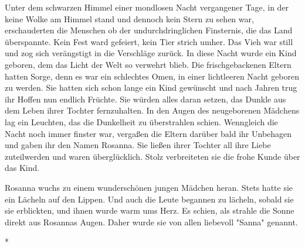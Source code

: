 \documentclass[10pt, a4paper, oneside]{book}
\begin{document}
\begin{multicols}{2}
Unter dem schwarzen Himmel einer mondlosen Nacht vergangener Tage, in der keine Wolke am Himmel stand und dennoch kein Stern zu sehen war, erschauderten die Menschen ob der undurchdringlichen Finsternis, die das Land überspannte. Kein Fest ward gefeiert, kein Tier strich umher. Das Vieh war still und zog sich verängstigt in die Verschläge zurück. In diese Nacht wurde ein Kind geboren, dem das Licht der Welt so verwehrt blieb. Die frischgebackenen Eltern hatten Sorge, denn es war ein schlechtes Omen, in einer lichtleeren Nacht geboren zu werden. Sie hatten sich schon lange ein Kind gewünscht und nach Jahren trug ihr Hoffen nun endlich Früchte. Sie würden alles daran setzen, das Dunkle aus dem Leben ihrer Tochter fernzuhalten. In den Augen des neugeborenen Mädchens lag ein Leuchten, das die Dunkelheit zu überstrahlen schien. Wenngleich die Nacht noch immer finster war, vergaßen die Eltern darüber bald ihr Unbehagen und gaben ihr den Namen Rosanna. Sie ließen ihrer Tochter all ihre Liebe zuteilwerden und waren überglücklich. Stolz verbreiteten sie die frohe Kunde über das Kind.\bigskip

Rosanna wuchs zu einem wunderschönen jungen Mädchen heran. Stets hatte sie ein Lächeln auf den Lippen. Und auch die Leute begannen zu lächeln, sobald sie sie erblickten, und ihnen wurde warm ums Herz. Es schien, als strahle die Sonne direkt aus Rosannas Augen. Daher wurde sie von allen liebevoll "Sanna" genannt.

\begin{center}
    *
\end{center}


\end{multicols}
\end{document}

